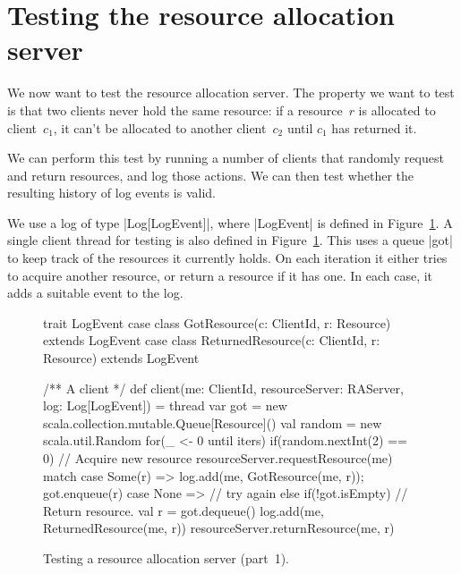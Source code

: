 \section{Testing the resource allocation server}

We now want to test the resource allocation server.  The property we want to
test is that two clients never hold the same resource: if a resource~$r$ is
allocated to client~$c_1$, it can't be allocated to another client~$c_2$ until
$c_1$ has returned it.

We can perform this test by running a number of clients that randomly request
and return resources, and log those actions.  We can then test whether the
resulting history of log events is valid.



We use a log of type |Log[LogEvent]|, where |LogEvent| is defined in
Figure~\ref{fig:RATest-1}.  
%
A single client thread for testing is also defined in
Figure~\ref{fig:RATest-1}.   This uses a
queue |got| to keep track of the resources it currently holds.  On each
iteration it either tries to acquire another resource, or return a resource if
it has one.  In each case, it adds a suitable event to the log.

\begin{figure}
\begin{scala}
  trait LogEvent
  case class GotResource(c: ClientId, r: Resource) extends LogEvent
  case class ReturnedResource(c: ClientId, r: Resource) extends LogEvent

  /** A client */
  def client(me: ClientId, resourceServer: RAServer, log: Log[LogEvent]) = thread{
    var got = new scala.collection.mutable.Queue[Resource]()
    val random = new scala.util.Random
    for(_ <- 0 until iters){
      if(random.nextInt(2) == 0){ // Acquire new resource
	resourceServer.requestResource(me) match{
          case Some(r) =>  log.add(me, GotResource(me, r)); got.enqueue(r)
          case None => {}  // try again
        }
      }
      else if(!got.isEmpty){     // Return resource.
	val r = got.dequeue()
        log.add(me, ReturnedResource(me, r))
	resourceServer.returnResource(me, r)
      }
    }
  }
\end{scala}
\caption{Testing a resource allocation server (part~1).}
\label{fig:RATest-1}
\end{figure}

